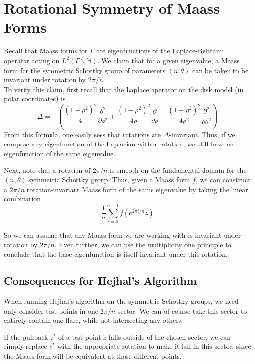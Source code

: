 \documentclass[]{article}
\begin{document}
\section*{Rotational Symmetry of Maass Forms}

Recall that Maass forms for $\Gamma$ are eigenfunctions of the Laplace-Beltrami operator acting on $L^2(\Gamma\backslash\mathbb{H})$.
We claim that for a given eigenvalue, a Maass form for the symmetric Schottky group of parameters $(n, \theta)$ can be taken to be invariant under rotation by $2\pi/n$.
\\

To verify this claim, first recall that the Laplace operator on the disk model (in polar coordinates) is
$$
\Delta = -\left(\frac{(1 - \rho^2)^2}{4}\frac{\partial^2}{\partial\rho^2} +
\frac{(1 - \rho^2)^2}{4\rho}\frac{\partial}{\partial\rho} +
\frac{(1 - \rho^2)^2}{4\rho^2}\frac{\partial^2}{\partial\theta^2}\right)
$$
From this formula, one easily sees that rotations are $\Delta$-invariant.
Thus, if we compose any eigenfunction of the Laplacian with a rotation, we still have an eigenfunction of the same eigenvalue.

Next, note that a rotation of $2\pi/n$ is smooth on the fundamental domain for the $(n, \theta)$ symmetric Schottky group.
Thus, given a Maass form $f$, we can construct a $2\pi/n$ rotation-invariant Maass form of the same eigenvalue by taking the linear combination
$$
\frac{1}{n}\sum_{i = 0}^{n - 1}f\left(e^{2\pi i/n} z\right)
$$

So we can assume that any Maass form we are working with is invariant under rotation by $2\pi/n$.
Even further, we can use the multiplicity one principle to conclude that the base eigenfunction is itself invariant under this rotation.

\subsection*{Consequences for Hejhal's Algorithm}

When running Hejhal's algorithm on the symmetric Schottky groups, we need only consider test points in one $2\pi/n$ sector.
We can of course take this sector to entirely contain one flare, while not intersecting any others.

If the pullback $z^*$ of a test point $z$ falls outside of the chosen sector, we can simply replace $z^*$ with the appropriate rotation to make it fall in this sector, since the Maass form will be equivalent at those different points.
\\
\end{document}
